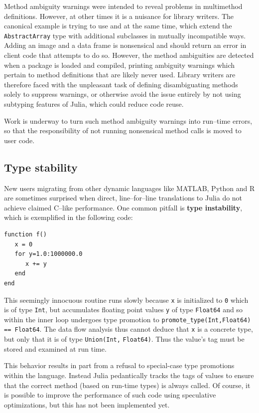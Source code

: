 \documentclass[pldi]{sigplanconf-pldi15}
\begin{document}
Method ambiguity warnings were intended to reveal problems in multimethod
definitions. However, at other times it is a nuisance for library
writers. The canonical example is trying to use  and
 at the same time, which extend the \verb|AbstractArray|
type with additional subclasses in mutually incompatible ways. Adding an image
and a data frame is nonsensical and should return an error in client code that
attempts to do so. However, the method ambiguities are detected when a package
is loaded and compiled, printing ambiguity warnings which pertain to method
definitions that are likely never used.
Library writers are therefore faced with the unpleasant task of defining
disambiguating methods solely to suppress warnings, or otherwise
avoid the issue entirely by not using subtyping features of Julia, which could
reduce code reuse.

Work is underway to turn such method ambiguity warnings into run--time errors,
so that the responsibility of not running nonsensical method calls is moved to
user code.

\subsection{Type stability}

New users migrating from other dynamic languages like MATLAB, Python and R are
sometimes surprised when direct, line--for--line translations to Julia do not
achieve claimed C--like performance.
One common pitfall is \textbf{type instability}, which is exemplified in the following
code:

\begin{lstlisting}
function f()
   x = 0
   for y=1.0:1000000.0
      x += y
   end
end
\end{lstlisting}
%
This seemingly innocuous routine runs slowly because \verb|x| is initialized to
\verb|0| which is of type \verb|Int|, but accumulates floating point values
\verb|y| of type \verb|Float64| and so within the inner loop undergoes type
promotion to \verb|promote_type(Int,Float64)| \verb|== Float64|. The data flow
analysis thus cannot deduce that \verb|x| is a concrete type, but only that it
is of type \verb|Union(Int,| \verb|Float64)|. Thus the value's tag must be
stored and examined at run time.

This behavior results in part from a refusal to special-case type promotions
within the language. Instead Julia pedantically tracks the tags of values to
ensure that the correct method (based on run-time types) is always called.
Of course, it is possible to improve the performance of such code using
speculative optimizations, but this has not been implemented yet.
\end{document}
